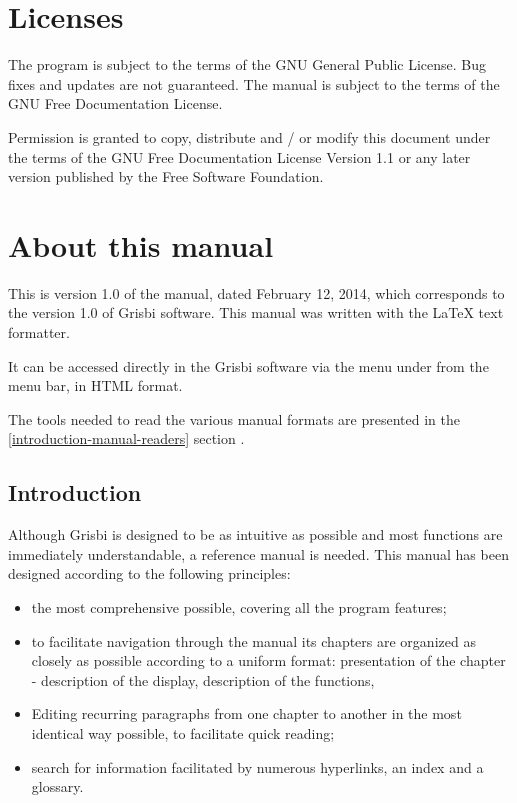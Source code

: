 \section{Licenses \label{introduction-licenses}}

The program is subject to the terms of the \gls{GNU General Public License}.  Bug fixes and updates are not guaranteed.  The manual is subject to the terms of the \gls{GNU Free Documentation License}.

Permission is granted to copy, distribute and / or modify this document under the terms of the GNU Free Documentation License Version 1.1 or any later version published by the Free Software Foundation.

\section{About this manual \label{introduction-manual}}

This is version \actuality{} 1.0 of the manual, dated \actuality{} February 12, 2014, which corresponds to the version 1.0 of Grisbi software.  This manual was written with the \gls{LaTeX}  \gls{text formatter}.

It can be accessed directly in the Grisbi software via the menu under  from the menu bar, in HTML format.


The tools needed to read the various manual formats are presented in the  \vref{introduction-manual-readers} section .

\subsection{Introduction \label{introduction-manual-presentation}}

Although Grisbi is designed to be as intuitive as possible and most functions are immediately understandable, a reference manual is needed. This manual has been designed according to the following principles:

\begin{itemize}%
	\item the most comprehensive possible, covering all the program features;
	\item to facilitate navigation through the manual its chapters are organized as closely as possible according to a uniform format: presentation of the chapter - description of the display, description of the functions, 
	\item Editing recurring paragraphs from one chapter to another in the most identical way possible, to facilitate quick reading;
	\item search for information facilitated by numerous \gls{hyperlinks}, an index and a glossary.
\end{itemize}


